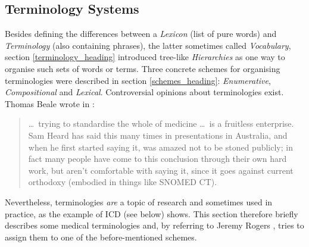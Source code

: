 %
%
%
%
%
%
%

\subsection{Terminology Systems}
\label{terminology_systems_heading}

Besides defining the differences between a \emph{Lexicon} (list of pure words)
and \emph{Terminology} (also containing phrases), the latter sometimes called
\emph{Vocabulary}, section \ref{terminology_heading} introduced tree-like
\emph{Hierarchies} as one way to organise such sets of words or terms. Three
concrete schemes for organising terminologies were described in section
\ref{schemes_heading}: \emph{Enumerative}, \emph{Compositional} and
\emph{Lexical}. Controversial opinions about terminologies exist. Thomas Beale
wrote in \cite[December 2003]{openhealth}:

\begin{quote}
    \ldots\ trying to standardise the whole of medicine \ldots\ is a fruitless
    enterprise. Sam Heard has said this many times in presentations in
    Australia, and when he first started saying it, was amazed not to be
    stoned publicly; in fact many people have come to this conclusion through
    their own hard work, but aren't comfortable with saying it, since it goes
    against current orthodoxy (embodied in things like SNOMED CT).
\end{quote}

Nevertheless, terminologies \emph{are} a topic of research and sometimes used
in practice, as the example of ICD (see below) shows. This section therefore
briefly describes some medical terminologies and, by referring to Jeremy Rogers
\cite{rogers}, tries to assign them to one of the before-mentioned schemes.











